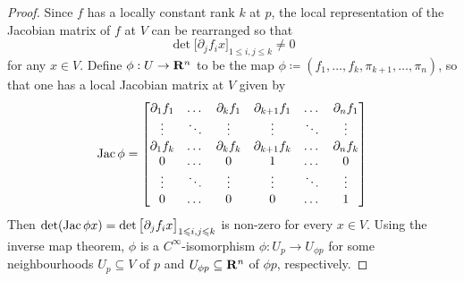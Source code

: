 \begin{proof}
    Since \(f\) has a locally constant rank \(k\) at \(p\), the local representation
    of the Jacobian matrix of \(f\) at \(V\) can be rearranged so that
    \[
        \det \Big[\partial_j f_i x \Big]_{1 \leq i, j \leq k} \neq 0
    \]
    for any \(x \in V\). Define \(\phi: U \to \mathbf{R}^n\) to be the map
    \(\phi \coloneq (f_1, \dots, f_k, \pi_{k+1}, \dots, \pi_n)\), so that one has a
    local Jacobian matrix at \(V\) given by
    \[
        \operatorname{Jac} \phi =
        \begin{bmatrix}
            \partial_1 f_1 & \dots              & \partial_k f_1
                           & \partial_{k+1} f_1 & \dots          & \partial_n f_1
            \\
            \vdots         & \ddots             & \vdots
                           & \vdots             & \ddots         & \vdots
            \\
            \partial_1 f_k & \dots              & \partial_k f_k
                           & \partial_{k+1} f_k & \dots          & \partial_n f_k
            \\
            0              & \dots              & 0
                           & 1                  & \dots          & 0
            \\
            \vdots         & \ddots             & \vdots
                           & \vdots             & \ddots         & \vdots
            \\
            0              & \dots              & 0
                           & 0                  & \dots          & 1
        \end{bmatrix}
    \]
    Then
    \(\det(\operatorname{Jac} \phi x) = \det\big[\partial_j f_i x \big]_{1 \leqslant i, j \leqslant k}\) is
    non-zero for every \(x \in V\). Using the inverse map theorem, \(\phi\) is a
    \(C^{\infty}\)-isomorphism \(\phi: U_p \to U_{\phi p}\) for some neighbourhoods
    \(U_p \subseteq V\) of \(p\) and \(U_{\phi p} \subseteq \mathbf{R}^n\) of \(\phi p\),
    respectively.


\end{proof}
